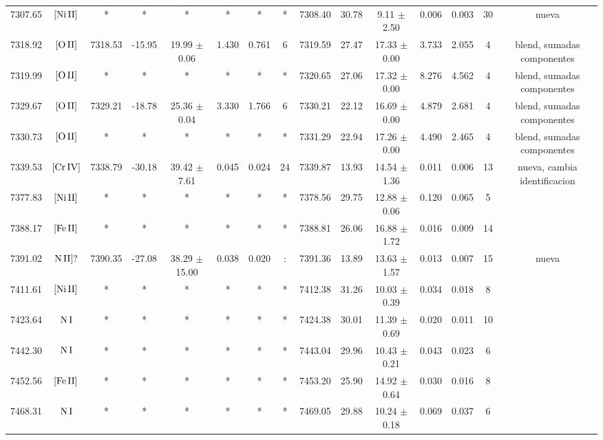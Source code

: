 \documentclass{article}
\begin{document}
\begin{table*}
\begin{adjustbox}{width=\textwidth}
\begin{tabular}{ccccccccccccccc}
7307.65 & $\mbox{[Ni}\thinspace \mbox{II]}$ & * & * & * & * & * & * & 7308.40 & 30.78 & 9.11 $\pm$ 2.50 & 0.006 & 0.003 & 30 &  nueva \\
7318.92 & $\mbox{[O}\thinspace \mbox{II]}$ & 7318.53 & -15.95 & 19.99 $\pm$ 0.06 & 1.430 & 0.761 & 6 & 7319.59 & 27.47 & 17.33 $\pm$ 0.00 & 3.733 & 2.055 & 4 &  blend, sumadas componentes \\
7319.99 & $\mbox{[O}\thinspace \mbox{II]}$ & * & * & * & * & * & * & 7320.65 & 27.06 & 17.32 $\pm$ 0.00 & 8.276 & 4.562 & 4 &  blend, sumadas componentes \\
7329.67 & $\mbox{[O}\thinspace \mbox{II]}$ & 7329.21 & -18.78 & 25.36 $\pm$ 0.04 & 3.330 & 1.766 & 6 & 7330.21 & 22.12 & 16.69 $\pm$ 0.00 & 4.879 & 2.681 & 4 &  blend, sumadas componentes \\
7330.73 & $\mbox{[O}\thinspace \mbox{II]}$ & * & * & * & * & * & * & 7331.29 & 22.94 & 17.26 $\pm$ 0.00 & 4.490 & 2.465 & 4 &  blend, sumadas componentes \\
7339.53 & $\mbox{[Cr}\thinspace \mbox{IV]}$ & 7338.79 & -30.18 & 39.42 $\pm$ 7.61 & 0.045 & 0.024 & 24 & 7339.87 & 13.93 & 14.54 $\pm$ 1.36 & 0.011 & 0.006 & 13 &  nueva, cambia identificacion \\
7377.83 & $\mbox{[Ni}\thinspace \mbox{II]}$ & * & * & * & * & * & * & 7378.56 & 29.75 & 12.88 $\pm$ 0.06 & 0.120 & 0.065 & 5 &  \\
7388.17 & $\mbox{[Fe}\thinspace \mbox{II]}$ & * & * & * & * & * & * & 7388.81 & 26.06 & 16.88 $\pm$ 1.72 & 0.016 & 0.009 & 14 &  \\
7391.02 & $\mbox{N}\thinspace \mbox{II]?}$ & 7390.35 & -27.08 & 38.29 $\pm$ 15.00 & 0.038 & 0.020 & : & 7391.36 & 13.89 & 13.63 $\pm$ 1.57 & 0.013 & 0.007 & 15 &  nueva \\
7411.61 & $\mbox{[Ni}\thinspace \mbox{II]}$ & * & * & * & * & * & * & 7412.38 & 31.26 & 10.03 $\pm$ 0.39 & 0.034 & 0.018 & 8 &  \\
7423.64 & $\mbox{N}\thinspace \mbox{I}$ & * & * & * & * & * & * & 7424.38 & 30.01 & 11.39 $\pm$ 0.69 & 0.020 & 0.011 & 10 &  \\
7442.30 & $\mbox{N}\thinspace \mbox{I}$ & * & * & * & * & * & * & 7443.04 & 29.96 & 10.43 $\pm$ 0.21 & 0.043 & 0.023 & 6 &  \\
7452.56 & $\mbox{[Fe}\thinspace \mbox{II]}$ & * & * & * & * & * & * & 7453.20 & 25.90 & 14.92 $\pm$ 0.64 & 0.030 & 0.016 & 8 &  \\
7468.31 & $\mbox{N}\thinspace \mbox{I}$ & * & * & * & * & * & * & 7469.05 & 29.88 & 10.24 $\pm$ 0.18 & 0.069 & 0.037 & 6 &  \\

\end{tabular}
\end{adjustbox}
\end{table*}
\end{document}
